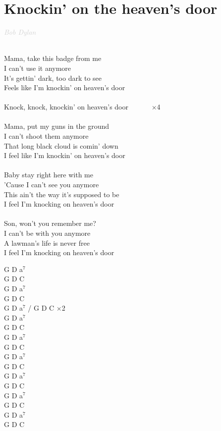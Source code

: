 \documentclass[a5paper, 10pt]{book}
\begin{document}
\newpage
\section{Knockin’ on the heaven’s door}\textcolor{lightgray}{\textit{Bob Dylan}}\\~\\
\begin{minipage}[t]{0.7\textwidth}
Mama, take this badge from me				\\
I can’t use it anymore		\\
It’s gettin’ dark, too dark to see\\
Feels like I’m knockin’ on heaven’s door\\
\\
\hspace*{5mm}Knock, knock, knockin’ on heaven’s door ~~~~~~$\times$4\\
\\
Mama, put my guns in the ground\\
I can’t shoot them anymore\\
That long black cloud is comin’ down\\
I feel like I’m knockin’ on heaven’s door\\
\\
Baby stay right here with me\\
’Cause I can’t see you anymore\\
This ain’t the way it’s supposed to be\\
I feel I’m knocking on heaven’s door\\
\\
Son, won’t you remember me?\\
I can’t be with you anymore\\
A lawman’s life is never free\\
I feel I’m knocking on heaven’s door\\
\end{minipage}
\begin{minipage}[t]{0.3\textwidth}
G D a$^7$\\
G D C\\
G D a$^7$\\
G D C\\

G D a$^7$ / G D C $\times$2\\

G D a$^7$\\
G D C\\
G D a$^7$\\
G D C\\

G D a$^7$\\
G D C\\
G D a$^7$\\
G D C\\

G D a$^7$\\
G D C\\
G D a$^7$\\
G D C\\

\end{minipage}
\end{document}
